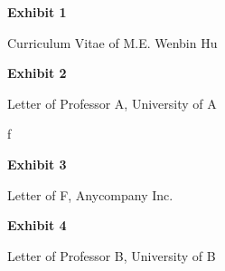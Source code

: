 \documentclass{article}
\begin{document}
\clearpage

\vspace*{\fill}
\begin{center}

{\LARGE \bf
Exhibit 1
}

\vspace{10\baselineskip}

{\large Curriculum Vitae of M.E. Wenbin Hu}

\end{center}
\vspace*{\fill}

% 

\vspace*{\fill}
\begin{center}

{\LARGE \bf
Exhibit 2
}

\vspace{10\baselineskip}

{\large Letter of Professor A, University of A}

\end{center}
\vspace*{\fill}
f
% 

\vspace*{\fill}
\begin{center}

{\LARGE \bf
Exhibit 3
}

\vspace{10\baselineskip}

{\large Letter of F, Anycompany Inc.}

\end{center}
\vspace*{\fill}

% 


\vspace*{\fill}
\begin{center}

{\LARGE \bf
Exhibit 4
}

\vspace{10\baselineskip}

{\large Letter of Professor B, University of B}

\end{center}
\vspace*{\fill}
\end{document}
